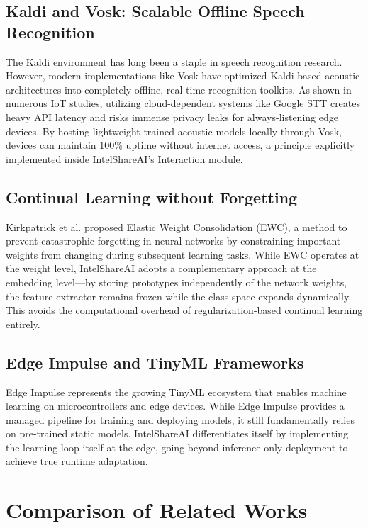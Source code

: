 \documentclass[12pt,a4paper]{report}
\begin{document}
\subsection{Kaldi and Vosk: Scalable Offline Speech Recognition}
The Kaldi environment \cite{kaldi} has long been a staple in speech recognition research. However, modern implementations like Vosk \cite{vosk} have optimized Kaldi-based acoustic architectures into completely offline, real-time recognition toolkits. As shown in numerous IoT studies, utilizing cloud-dependent systems like Google STT creates heavy API latency and risks immense privacy leaks for always-listening edge devices. By hosting lightweight trained acoustic models locally through Vosk, devices can maintain 100\% uptime without internet access, a principle explicitly implemented inside IntelShareAI's Interaction module.

\subsection{Continual Learning without Forgetting}
Kirkpatrick et al. proposed Elastic Weight Consolidation (EWC), a method to prevent catastrophic forgetting in neural networks by constraining important weights from changing during subsequent learning tasks. While EWC operates at the weight level, IntelShareAI adopts a complementary approach at the embedding level---by storing prototypes independently of the network weights, the feature extractor remains frozen while the class space expands dynamically. This avoids the computational overhead of regularization-based continual learning entirely.

\subsection{Edge Impulse and TinyML Frameworks}
Edge Impulse represents the growing TinyML ecosystem that enables machine learning on microcontrollers and edge devices. While Edge Impulse provides a managed pipeline for training and deploying models, it still fundamentally relies on pre-trained static models. IntelShareAI differentiates itself by implementing the learning loop itself at the edge, going beyond inference-only deployment to achieve true runtime adaptation.

\section{Comparison of Related Works}
\end{document}
